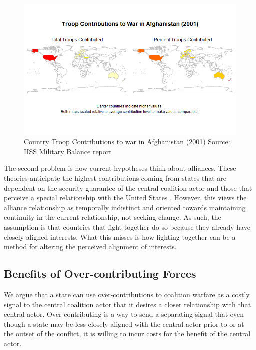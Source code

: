 \documentclass[12pt,letterpaper]{article}
\begin{document}
		\begin{figure}[H]
			\centering
			\includegraphics[width=\textwidth]{troops_2001_sidebyside_scaled.png}
			\caption{Country Troop Contributions to war in Afghanistan (2001) Source: IISS Military Balance report}
			\label{fig:contrib_map}
		\end{figure}

		The second problem is how current hypotheses think about alliances. These theories anticipate the highest contributions coming from states that are dependent on the security guarantee of the central coalition actor and those that perceive a special relationship with the United States \citep{haesebrouck_democraticparticipationair_2016, howorth_securitydefencepolicy_2014, graeger_revivalatlanticismnato_2009, biehl_strategiccultureseurope_2013}. However, this views the alliance relationship as temporally indistinct and oriented towards maintaining continuity in the current relationship, not seeking change. As such, the assumption is that countries that fight together do so because they already have closely aligned interests. What this misses is how fighting together can be a method for altering the perceived alignment of interests.

	\subsection{Benefits of Over-contributing Forces}
		We argue that a state can use over-contributions to coalition warfare as a costly signal to the central coalition actor that it desires a closer relationship with that central actor. Over-contributing is a way to send a separating signal that even though a state may be less closely aligned with the central actor prior to or at the outset of the conflict, it is willing to incur costs for the benefit of the central actor.
\end{document}
